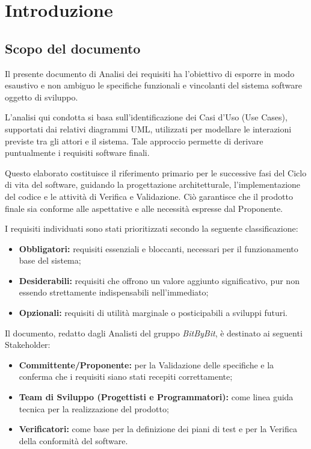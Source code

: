 \documentclass[a4paper,12pt]{article}
\begin{document}
\clearpage

\tableofcontents
\thispagestyle{empty}

\clearpage

\listoftables

\listoffigures

\clearpage


\section{Introduzione}
\subsection{Scopo del documento} \label{sec:scopo_documento}
Il presente documento di Analisi dei requisiti ha l'obiettivo di esporre in modo esaustivo e non ambiguo le specifiche funzionali e vincolanti del sistema software oggetto di sviluppo.

L'analisi qui condotta si basa sull'identificazione dei Casi d'Uso (Use Cases), supportati dai relativi diagrammi UML, utilizzati per modellare le interazioni previste tra gli attori e il sistema. Tale approccio permette di derivare puntualmente i requisiti software finali.

Questo elaborato costituisce il riferimento primario per le successive fasi del Ciclo di vita del software, guidando la progettazione architetturale, l'implementazione del codice e le attività di Verifica e Validazione. Ciò garantisce che il prodotto finale sia conforme alle aspettative e alle necessità espresse dal Proponente.

I requisiti individuati sono stati prioritizzati secondo la seguente classificazione:
\begin{itemize}
    \item \textbf{Obbligatori:} requisiti essenziali e bloccanti, necessari per il funzionamento base del sistema;
    \item \textbf{Desiderabili:} requisiti che offrono un valore aggiunto significativo, pur non essendo strettamente indispensabili nell'immediato;
    \item \textbf{Opzionali:} requisiti di utilità marginale o posticipabili a sviluppi futuri.
\end{itemize}

Il documento, redatto dagli Analisti del gruppo \textit{BitByBit}, è destinato ai seguenti Stakeholder:
\begin{itemize}
    \item \textbf{Committente/Proponente:} per la Validazione delle specifiche e la conferma che i requisiti siano stati recepiti correttamente;
    \item \textbf{Team di Sviluppo (Progettisti e Programmatori):} come linea guida tecnica per la realizzazione del prodotto;
    \item \textbf{Verificatori:} come base per la definizione dei piani di test e per la Verifica della conformità del software.
\end{itemize}
\end{document}
